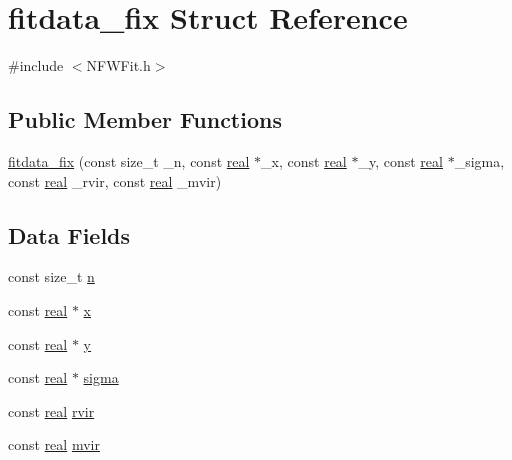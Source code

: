 \section{fitdata\_\-fix Struct Reference}
\label{structfitdata__fix}


{\ttfamily \#include $<$NFWFit.h$>$}

\subsection*{Public Member Functions}
\begin{DoxyCompactItemize}
\item 
\hyperlink{structfitdata__fix_a4291430c5b63ba3f633deffeebed99e5}{fitdata\_\-fix} (const size\_\-t \_\-n, const \hyperlink{Global_8h_a031f8951175b43076c2084a6c2173410}{real} $\ast$\_\-x, const \hyperlink{Global_8h_a031f8951175b43076c2084a6c2173410}{real} $\ast$\_\-y, const \hyperlink{Global_8h_a031f8951175b43076c2084a6c2173410}{real} $\ast$\_\-sigma, const \hyperlink{Global_8h_a031f8951175b43076c2084a6c2173410}{real} \_\-rvir, const \hyperlink{Global_8h_a031f8951175b43076c2084a6c2173410}{real} \_\-mvir)
\end{DoxyCompactItemize}
\subsection*{Data Fields}
\begin{DoxyCompactItemize}
\item 
const size\_\-t \hyperlink{structfitdata__fix_a30184cc397db6f5fb5c951c481095df0}{n}
\item 
const \hyperlink{Global_8h_a031f8951175b43076c2084a6c2173410}{real} $\ast$ \hyperlink{structfitdata__fix_a18e0f2f1c447bbfe33ee5c2ca66ca672}{x}
\item 
const \hyperlink{Global_8h_a031f8951175b43076c2084a6c2173410}{real} $\ast$ \hyperlink{structfitdata__fix_a3743fa3a545ef48052b42d03542e1d37}{y}
\item 
const \hyperlink{Global_8h_a031f8951175b43076c2084a6c2173410}{real} $\ast$ \hyperlink{structfitdata__fix_ad606fe7158b3e91db619bb245e119a2d}{sigma}
\item 
const \hyperlink{Global_8h_a031f8951175b43076c2084a6c2173410}{real} \hyperlink{structfitdata__fix_a0f7dc85f6b6c67490c13e36a0c670946}{rvir}
\item 
const \hyperlink{Global_8h_a031f8951175b43076c2084a6c2173410}{real} \hyperlink{structfitdata__fix_a07ea037ea7788024cb2c382236c661d3}{mvir}
\end{DoxyCompactItemize}


